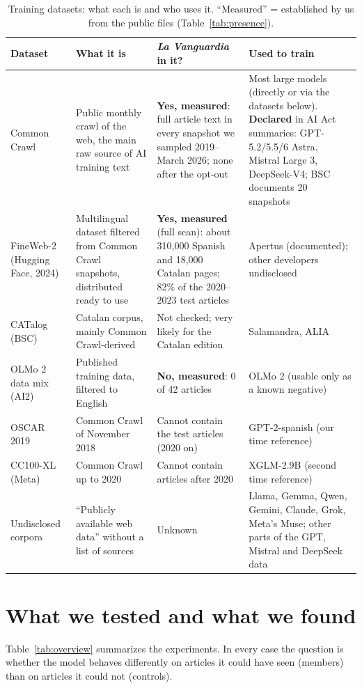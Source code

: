 \documentclass[10pt,a4paper]{article}
\begin{document}
\begin{table}[h]\centering\footnotesize
\begin{tabularx}{\linewidth}{>{\raggedright\arraybackslash}p{2.3cm}>{\raggedright\arraybackslash}X>{\raggedright\arraybackslash}X>{\raggedright\arraybackslash}p{3.0cm}}
\toprule
Dataset & What it is & \emph{La Vanguardia} in it? & Used to train\\
\midrule
Common Crawl & Public monthly crawl of the web, the main raw source of AI training text & \textbf{Yes, measured}: full article
text in every snapshot we sampled 2019--March 2026; none after the opt-out & Most large models (directly or via the
datasets below). \textbf{Declared} in AI Act summaries: GPT-5.2/5.5/6 Astra, Mistral Large 3, DeepSeek-V4; BSC
documents 20 snapshots\\
FineWeb-2 (Hugging Face, 2024) & Multilingual dataset filtered from Common Crawl snapshots, distributed ready to use &
\textbf{Yes, measured} (full scan): about 310,000 Spanish and 18,000 Catalan pages; 82\% of the 2020--2023 test
articles & Apertus (documented); other developers undisclosed\\
CATalog (BSC) & Catalan corpus, mainly Common Crawl-derived & Not checked; very likely for the Catalan edition &
Salamandra, ALIA\\
OLMo 2 data mix (AI2) & Published training data, filtered to English & \textbf{No, measured}: 0 of 42 articles & OLMo 2
(usable only as a known negative)\\
OSCAR 2019 & Common Crawl of November 2018 & Cannot contain the test articles (2020 on) & GPT-2-spanish (our time
reference)\\
CC100-XL (Meta) & Common Crawl up to 2020 & Cannot contain articles after 2020 & XGLM-2.9B (second time reference)\\
Undisclosed corpora & ``Publicly available web data'' without a list of sources & Unknown & Llama, Gemma, Qwen,
Gemini, Claude, Grok, Meta's Muse; other parts of the GPT, Mistral and DeepSeek data\\
\bottomrule
\end{tabularx}
\caption{Training datasets: what each is and who uses it. ``Measured'' = established by us from the public files
(Table~\ref{tab:presence}).}\label{tab:datasets}
\end{table}

\section{What we tested and what we found}\label{sec:results}
Table~\ref{tab:overview} summarizes the experiments. In every case the question is whether the model behaves
differently on articles it could have seen (members) than on articles it could not (controls).
\end{document}
